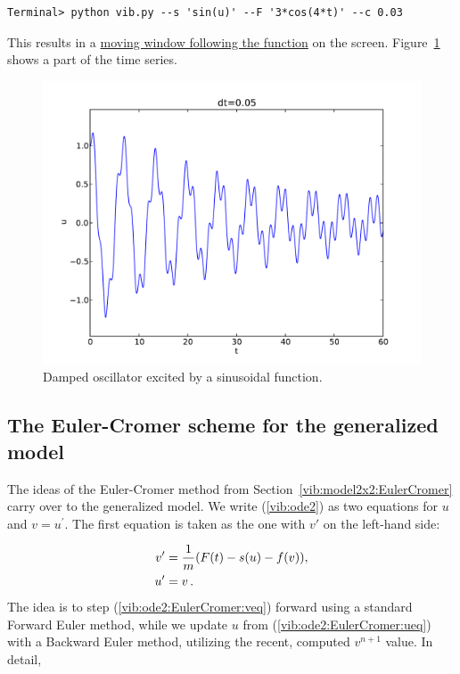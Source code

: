 \documentclass[%
oneside,                 %
final,                   %
10pt]{article}
\begin{document}
\begin{Verbatim}[frame=lines,label=\fbox{{\tiny Terminal}},framesep=2.5mm,framerule=0.7pt,fontsize=\fontsize{9pt}{9pt}]
Terminal> python vib.py --s 'sin(u)' --F '3*cos(4*t)' --c 0.03
\end{Verbatim}
This results in a \href{{http://tinyurl.com/opdfafk/pub/mov-vib/vib_generalized_dt0.05/index.html}}{moving window following the function} on the screen.
Figure~\ref{vib:ode2:fig:demo} shows a part of the time series.


\begin{figure}[!ht]  %
  \centerline{\includegraphics[width=1.0\linewidth]{fig-vib/vib_gen_demo.pdf}}
  \caption{
  Damped oscillator excited by a sinusoidal function. \label{vib:ode2:fig:demo}
  }
\end{figure}


\subsection{The Euler-Cromer scheme for the generalized model}

The ideas of the Euler-Cromer method from Section~\ref{vib:model2x2:EulerCromer}
carry over to the generalized model. We write (\ref{vib:ode2})
as two equations for $u$ and $v=u^{\prime}$. The first equation is taken as the
one with $v'$ on the left-hand side:

\begin{align}
v' &= \frac{1}{m}(F(t)-s(u)-f(v)),
\label{vib:ode2:EulerCromer:veq}\\ 
u^{\prime} &= v\tp
\label{vib:ode2:EulerCromer:ueq}
\end{align}
The idea is to step (\ref{vib:ode2:EulerCromer:veq}) forward using
a standard Forward Euler method, while we update $u$ from
(\ref{vib:ode2:EulerCromer:ueq}) with a Backward Euler method,
utilizing the recent, computed $v^{n+1}$ value. In detail,
\end{document}

